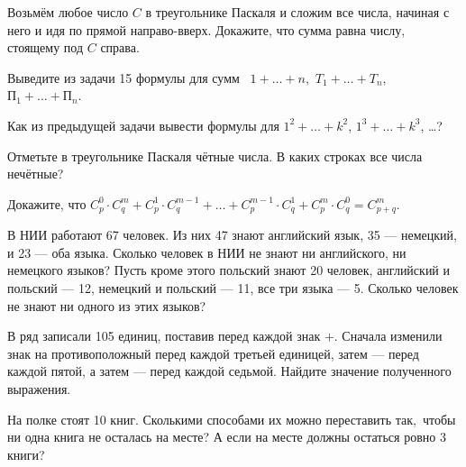 \documentclass[a4paper,12pt]{article}
\begin{document}
Возьм\"ем любое число $C$ в треугольнике Паскаля и сложим все
числа, начиная с него и идя по прямой направо-вверх.
Докажите, что сумма равна числу, стоящему под $C$ справа.

Выведите из задачи 15 формулы для сумм \
$1+\ldots+n$,\ $T_1+\ldots+T_n$,\ $П_1+\ldots+П_n$.

Как из предыдущей задачи вывести формулы для  $1^2+\dots+k^2$,
$1^3+\dots+k^3$, \ldots?

Отметьте в треугольнике Паскаля чётные числа.
В каких строках %
все числа неч\"етные?

Докажите, что
$C_p^0\cdot C_q^m+C_p^1\cdot C_q^{m-1}+\dots+C_p^{m-1}\cdot C_q^1
+C_p^m\cdot C_q^0=C_{p+q}^m$.

\vspace*{-0.2truecm}


\vspace*{-0.2truecm}

В НИИ работают 67 человек. Из них
47 знают английский язык, 35 --- немецкий, и 23 --- оба языка.
Сколько человек в НИИ
не знают ни английского, ни немецкого языков?
 Пусть кроме этого  польский
знают 20 человек, английский и польский --- 12, немецкий и
польский --- 11, все три языка --- 5.
Сколько человек не знают ни одного из этих языков?

В ряд записали 105 единиц, поставив перед каждой знак $+$.
Сначала изменили знак на противоположный перед каждой третьей единицей,
затем --- перед каждой пятой, а затем --- перед
каждой седьмой. Найдите значение полученного выражения.

 
На полке стоят 10 книг. Сколькими способами их можно переставить
так,~чтобы ни одна книга не осталась на месте?
 А если на месте должны остаться ровно 3 книги?

\vspace*{-2mm}
\vspace*{-3mm}
\end{document}
